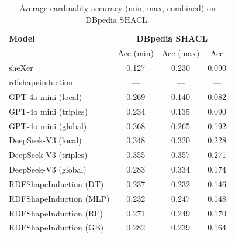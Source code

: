 \begin{table}[h]
\centering
\begin{tabular}{l|ccc}
\hline
\textbf{Model} & \multicolumn{3}{c}{\textbf{DBpedia SHACL}} \\
 & Acc (min) & Acc (max) & Acc \\
\hline
sheXer & 0.127 & 0.230 & 0.090 \\
rdfshapeinduction & --- & --- & --- \\
GPT-4o mini (local) & 0.269 & 0.140 & 0.082 \\
GPT-4o mini (triples) & 0.234 & 0.135 & 0.090 \\
GPT-4o mini (global) & 0.368 & 0.265 & 0.192 \\
DeepSeek-V3 (local) & 0.348 & 0.320 & 0.228 \\
DeepSeek-V3 (triples) & 0.355 & 0.357 & 0.271 \\
DeepSeek-V3 (global) & 0.283 & 0.334 & 0.174 \\
RDFShapeInduction (DT) & 0.237 & 0.232 & 0.146 \\
RDFShapeInduction (MLP) & 0.232 & 0.247 & 0.148 \\
RDFShapeInduction (RF) & 0.271 & 0.249 & 0.170 \\
RDFShapeInduction (GB) & 0.282 & 0.239 & 0.164 \\
\hline
\end{tabular}
\caption{Average cardinality accuracy (min, max, combined) on DBpedia SHACL.}
\label{tab:t5-cardinality-dbpedia}
\end{table}
